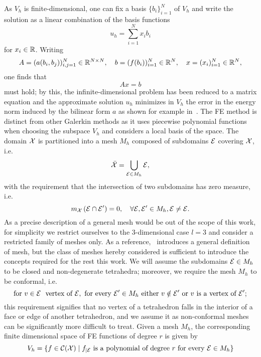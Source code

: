 As $V_h$ is finite-dimensional, one can fix a basis $\{ b_i\}_{i=1}^N$ of $V_h$ and write the solution as a linear combination of the basis functions
\[
    u_h = \sum_{i=1}^N x_i b_i
\]
for $x_i \in \mathbb{R}$.
Writing 
\begin{equation*}
    A = (a(b_i,b_j))_{i,j=1}^N \in \mathbb{R}^{N \times N}, \quad b = (f(b_i))_{i=1}^N \in \mathbb{R}^N, \quad x = (x_i)_{i=1}^N \in \mathbb{R}^N,
\end{equation*} 
one finds that
\begin{equation}\label{eq:Galerkin-formulation}
    Ax = b
\end{equation}
must hold; by this, the infinite-dimensional problem has been reduced to a matrix equation and the approximate solution $u_h$ minimizes in $V_h$ the error in the energy norm induced by the bilinear form $a$ as shown for example in~\cite[Theorem 4.3]{DeuflhardWeiser2012}.\newline
The FE method is distinct from other Galerkin methods as it uses piecewise polynomial functions when choosing the subspace $V_h$ and considers a local basis of the space.
The domain $\mathcal X$ is partitioned into a mesh $M_h$ composed of subdomains $\mathcal E$ covering $\mathcal X$, i.e.
\[
    \bar{\mathcal X} = \bigcup_{\mathcal E \in M_h} \mathcal E,
\]
with the requirement that the intersection of two subdomains has zero measure, i.e. 
\[
    m_{\mathcal X}\left(\mathcal E \cap \mathcal E'\right) = 0, \quad \forall \mathcal E, \mathcal E' \in M_h, \mathcal E \neq \mathcal E.
\]
As a precise description of a general mesh would be out of the scope of this work, for simplicity we restrict ourselves to the 3-dimensional case $l=3$ and consider a restricted family of meshes only.
As a reference,~\cite[Chapter 4.3]{DeuflhardWeiser2012} introduces a general definition of mesh, but the class of meshes hereby considered is sufficient to introduce the concepts required for the rest this work.
We will assume the subdomains $\mathcal E \in M_h$ to be closed and non-degenerate tetrahedra; moreover, we require the mesh $M_h$ to be conformal, i.e. 
\[
 \text{for } v \in \mathcal E \ \text{ vertex of } \mathcal E, \text{ for every } \mathcal E' \in M_h \text{ either } v \notin \mathcal E' \text{ or } v \text{ is a vertex of } \mathcal E';
\]
this requirement signifies that no vertex of a tetrahedron falls in the interior of a face or edge of another tetrahedron, and we assume it as non-conformal meshes can be significantly more difficult to treat. \newline
Given a mesh $M_h$, the corresponding finite dimensional space of FE functions of degree $r$ is given by 
\[
    V_h = \{ f\in \mathcal C(\mathcal X) \mid f_{\mid \mathcal E} \text{ is a polynomial of degree } r \text{ for every } \mathcal E \in M_h \}
\]  
